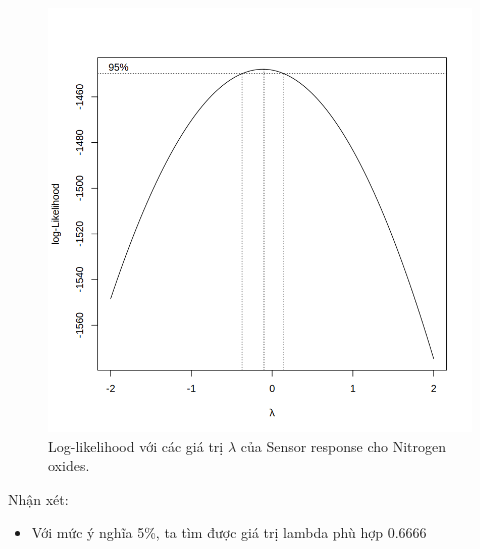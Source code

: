 \begin{figure}[H]
    \centering
    \includegraphics[width=0.75\columnwidth]{air_figures/AH_optimal_lambda.png}
    \caption{Log-likelihood với các giá trị $\lambda$ của Sensor response cho Nitrogen oxides.}
    \label{fig:ah_optimal_lambda}
\end{figure}
Nhận xét:
\begin{itemize}
    \item Với mức ý nghĩa 5\%, ta tìm được giá trị lambda phù hợp 0.6666
\end{itemize}

